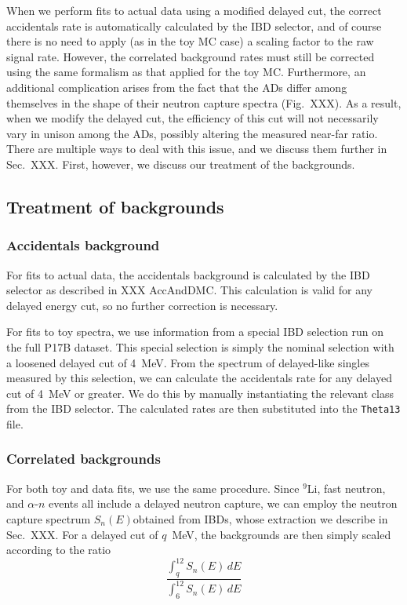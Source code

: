\documentclass[../thesis.tex]{subfiles}
\begin{document}
When we perform fits to actual data using a modified delayed cut, the correct accidentals rate is automatically calculated by the IBD selector, and of course there is no need to apply (as in the toy MC case) a scaling factor to the raw signal rate. However, the correlated background rates must still be corrected using the same formalism as that applied for the toy MC. Furthermore, an additional complication arises from the fact that the ADs differ among themselves in the shape of their neutron capture spectra (Fig.~XXX). As a result, when we modify the delayed cut, the efficiency of this cut will not necessarily vary in unison among the ADs, possibly altering the measured near-far ratio. There are multiple ways to deal with this issue, and we discuss them further in Sec.~XXX. First, however, we discuss our treatment of the backgrounds.

\subsection{Treatment of backgrounds}
\label{sec:cutVaryDelayedCutBkgTreatment}

\subsubsection{Accidentals background}

For fits to actual data, the accidentals background is calculated by the IBD selector as described in XXX AccAndDMC. This calculation is valid for any delayed energy cut, so no further correction is necessary.

For fits to toy spectra, we use information from a special IBD selection run on the full P17B dataset. This special selection is simply the nominal selection with a loosened delayed cut of 4~MeV. From the spectrum of delayed-like singles measured by this selection, we can calculate the accidentals rate for any delayed cut of 4~MeV or greater. We do this by manually instantiating the relevant class from the IBD selector. The calculated rates are then substituted into the \texttt{Theta13} file.

\subsubsection{Correlated backgrounds}

For both toy and data fits, we use the same procedure. Since $^9$Li, fast neutron, and $\alpha$-$n$ events all include a delayed neutron capture, we can employ the neutron capture spectrum $S_n(E)$obtained from IBDs, whose extraction we describe in Sec.~XXX. For a delayed cut of $q$~MeV, the backgrounds are then simply scaled according to the ratio
\begin{equation}
  \label{eq:cutVaryDelCutCorrBkgScale}
  \frac{\int_q^{12} S_n(E)\,dE}{\int_6^12 S_n(E)\,dE}
\end{equation}
\end{document}
